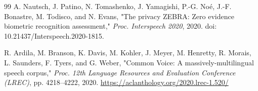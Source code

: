 \documentclass[10pt,twocolumn]{article}
\begin{document}
\begin{thebibliography}{99}
A. Nautsch, J. Patino, N. Tomashenko, J. Yamagishi, P.-G. No\'e, J.-F. Bonastre, M. Todisco, and N. Evans, "The privacy ZEBRA: Zero evidence biometric recognition assessment," \textit{Proc. Interspeech 2020}, 2020. doi: 10.21437/Interspeech.2020-1815.

R. Ardila, M. Branson, K. Davis, M. Kohler, J. Meyer, M. Henretty, R. Morais, L. Saunders, F. Tyers, and G. Weber, "Common Voice: A massively-multilingual speech corpus," \textit{Proc. 12th Language Resources and Evaluation Conference (LREC)}, pp. 4218--4222, 2020. \url{https://aclanthology.org/2020.lrec-1.520/}

\end{thebibliography}
\end{document}
